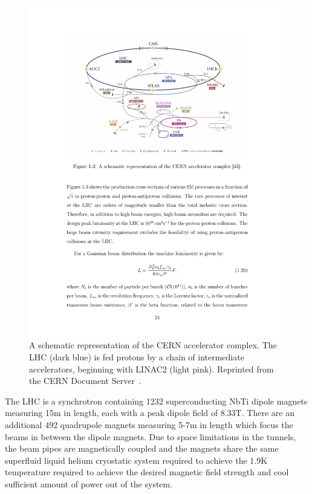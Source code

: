 \begin{figure}[htbp]
  \centering
  \includegraphics[width=.775\textwidth]{Collider/Figures/LHC_diagram.pdf}
  \caption{
    A schematic representation of the CERN accelerator complex. 
    The LHC (dark blue) is fed protons by a chain of intermediate accelerators, beginning with LINAC2 (light pink).
    Reprinted from the CERN Document Server~\cite{Mobs2018}. 
  }
  \label{fig:lhc}
\end{figure}


The LHC is a synchrotron containing 1232 superconducting NbTi dipole magnets measuring 15\unit{m} in length, each with a peak dipole field of 8.33\unit{T}. 
There are an additional 492 quadrupole magnets measuring 5-7\unit{m} in length which focus the beams in between the dipole magnets.
Due to space limitations in the tunnels, the beam pipes are
magnetically coupled and the magnets share the same superfluid liquid
helium cryostatic system required to achieve the 1.9\unit{K}
temperature  required to achieve the desired magnetic field strength and cool sufficient amount of power out of the system.

